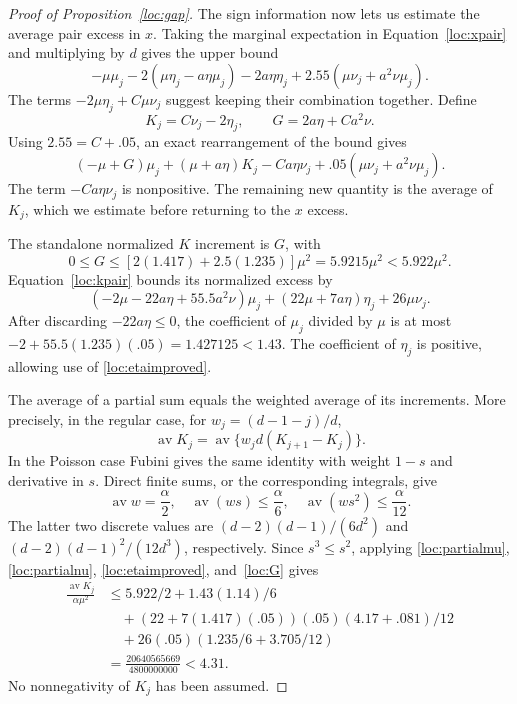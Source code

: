 \begin{proof}[Proof of Proposition~\ref{loc:gap}]
The sign information now lets us estimate the average pair excess in
$x$.  Taking the marginal expectation in Equation~\eqref{loc:xpair}
and multiplying by $d$ gives the upper bound
\[
 -\mu\mu_j-2(\mu\eta_j-a\eta\mu_j)-2a\eta\eta_j
       +2.55(\mu\nu_j+a^2\nu\mu_j).
\]
The terms $-2\mu\eta_j+C\mu\nu_j$ suggest keeping their
combination together.  Define
\[
 K_j=C\nu_j-2\eta_j,\qquad G=2a\eta+C a^2\nu.
\]
Using $2.55=C+.05$, an exact rearrangement of the bound gives
\begin{equation}\label{loc:finalincrement}
 (-\mu+G)\mu_j+(\mu+a\eta)K_j-Ca\eta\nu_j
       +.05(\mu\nu_j+a^2\nu\mu_j).
\end{equation}
The term $-Ca\eta\nu_j$ is nonpositive.  The remaining new
quantity is the average of $K_j$, which we estimate before returning
to the $x$ excess.

The standalone normalized $K$ increment is $G$, with
\begin{equation}\label{loc:G}
 0\le G\le[2(1.417)+2.5(1.235)]\mu^2
       =5.9215\mu^2<5.922\mu^2.
\end{equation}
Equation~\eqref{loc:kpair} bounds its normalized excess by
\[
 (-2\mu-22a\eta+55.5a^2\nu)\mu_j
 +(22\mu+7a\eta)\eta_j+26\mu\nu_j.
\]
After discarding $-22a\eta\le0$, the coefficient of $\mu_j$ divided
by $\mu$ is at most
$-2+55.5(1.235)(.05)=1.427125<1.43$.
The coefficient of $\eta_j$ is positive, allowing use of
\eqref{loc:etaimproved}.

The average of a partial sum equals the weighted average of its
increments.  More precisely, in the regular case, for
$w_j=(d-1-j)/d$,
\[
 \operatorname{av}K_j
 =\operatorname{av}\{w_j d(K_{j+1}-K_j)\}.
\]
In the Poisson case Fubini gives the same identity with weight $1-s$
and derivative in $s$.  Direct finite sums, or the corresponding
integrals, give
\begin{equation}\label{loc:weightedaverages}
 \operatorname{av}w=\frac\alpha2,\quad
 \operatorname{av}(ws)\le\frac\alpha6,\quad
 \operatorname{av}(ws^2)\le\frac\alpha{12}.
\end{equation}
The latter two discrete values are
$(d-2)(d-1)/(6d^2)$ and
$(d-2)(d-1)^2/(12d^3)$, respectively.
Since $s^3\le s^2$, applying
\eqref{loc:partialmu}, \eqref{loc:partialnu},
\eqref{loc:etaimproved}, and~\eqref{loc:G} gives
\begin{align}
 \frac{\operatorname{av}K_j}{\alpha\mu^2}
 &\le5.922/2+1.43(1.14)/6\nonumber\\
 &\quad+(22+7(1.417)(.05))(.05)(4.17+.081)/12\nonumber\\
 &\quad+26(.05)(1.235/6+3.705/12)\nonumber\\
 &=\frac{20640565669}{4800000000}<4.31.
 \label{loc:Kaverage}
\end{align}
No nonnegativity of $K_j$ has been assumed.


\end{proof}
